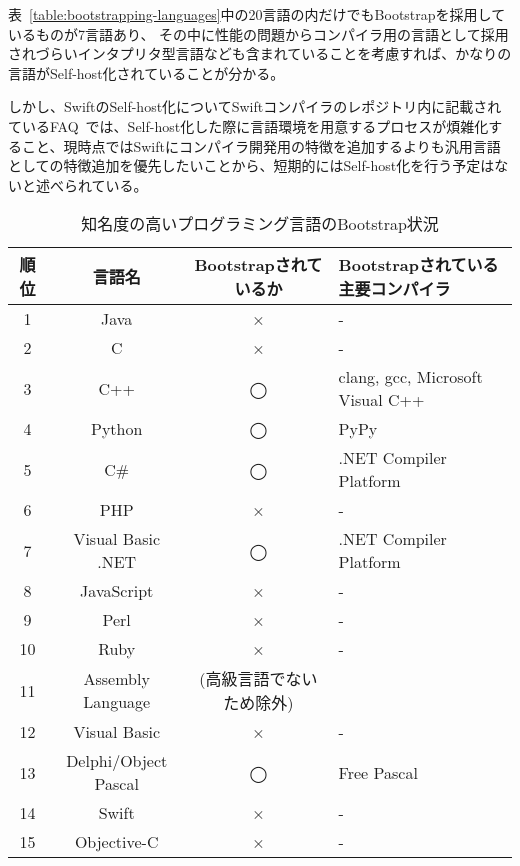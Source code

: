 表~\ref{table:bootstrapping-languages}中の20言語の内だけでもBootstrapを採用しているものが7言語あり、 その中に性能の問題からコンパイラ用の言語として採用されづらいインタプリタ型言語なども含まれていることを考慮すれば、かなりの言語がSelf-host化されていることが分かる。

しかし、SwiftのSelf-host化についてSwiftコンパイラのレポジトリ内に記載されているFAQ~\cite{swift-faq}では、Self-host化した際に言語環境を用意するプロセスが煩雑化すること、現時点ではSwiftにコンパイラ開発用の特徴を追加するよりも汎用言語としての特徴追加を優先したいことから、短期的にはSelf-host化を行う予定はないと述べられている。

\begin{table}[hb]
    \begin{center}
        \caption{知名度の高いプログラミング言語のBootstrap状況}
        \begin{tabular}{|c|c|c|m{4.5cm}|}
            \hline
            順位 & 言語名 & Bootstrapされているか & Bootstrapされている主要コンパイラ \\
            \hline
            1 & Java & × & - \\
            \hline
            2 & C & × & - \\
            \hline
            3 & C++ & ◯ & clang, gcc, Microsoft Visual C++ \\
            \hline
            4 & Python & ◯ & PyPy \\
            \hline
            5 & C\# & ◯ & .NET Compiler Platform \\
            \hline
            6 & PHP & × & - \\
            \hline
            7 & Visual Basic .NET & ◯ & .NET Compiler Platform \\
            \hline
            8 & JavaScript & × & - \\
            \hline
            9 & Perl & × & - \\
            \hline
            10 & Ruby & × & - \\
            \hline
            11 & Assembly Language & (高級言語でないため除外) & \\
            \hline
            12 & Visual Basic & × & - \\
            \hline
            13 & Delphi/Object Pascal & ◯ & Free Pascal \\
            \hline
            14 & Swift & × & - \\
            \hline
            15 & Objective-C & × & - \\

\end{tabular}
\end{center}
\end{table}
